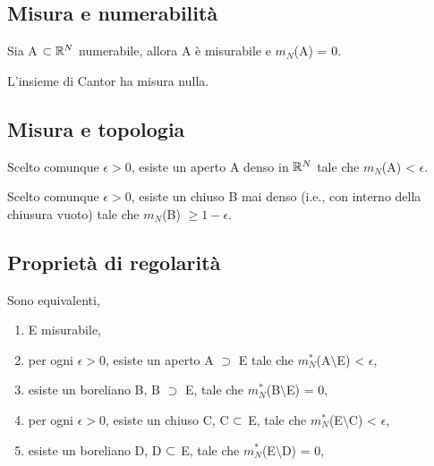 \documentclass[Completo.tex]{subfiles}
\begin{document}
\subsection{Misura e numerabilità}
\begin{Prop}
	Sia A $\sset \bb[R]^{N}$ numerabile, allora A è misurabile e $m_N$(A) = 0.
\end{Prop}
\begin{Prop}
	L'insieme di Cantor ha misura nulla.
\end{Prop}
\subsection{Misura e topologia}
\begin{Prop}
	Scelto comunque $\epsilon > 0$, esiste un aperto A denso in $\bb[R]^{N}$ tale che $m_N$(A) < $\epsilon$.
\end{Prop}
\begin{Prop}
	Scelto comunque $\epsilon > 0$, esiste un chiuso B mai denso (i.e., con interno della chiusura vuoto) tale che $m_N$(B) $\geq 1-\epsilon$.
\end{Prop}
\subsection{Proprietà di regolarità}
\begin{eTh}
	Sono equivalenti,
	\begin{enumerate}
		\item E misurabile,
		\item per ogni $\epsilon > 0$, esiste un aperto A $\supset$ E tale che $m_N^{*}$(A$\setminus$E) < $\epsilon$,
		\item esiste un boreliano B, B $\supset$ E, tale che $m_N^{*}$(B$\setminus$E) = 0,
		\item per ogni $\epsilon > 0$, esiste un chiuso C, C $\subset$ E, tale che $m_N^{*}$(E$\setminus$C) < $\epsilon$,
		\item esiste un boreliano D, D $\subset$ E, tale che $m_N^{*}$(E$\setminus$D) = 0,
	\end{enumerate}
\end{eTh}
\end{document}

